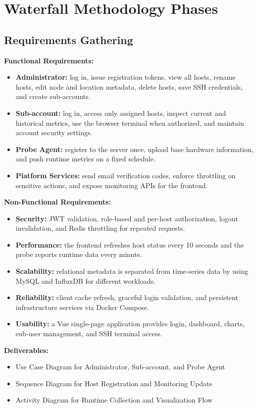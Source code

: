 \documentclass[11pt,a4paper]{article}
\begin{document}
\section{Waterfall Methodology Phases}

\subsection{Requirements Gathering}

\textbf{Functional Requirements:}
\begin{itemize}
  \item \textbf{Administrator:} log in, issue registration tokens, view all hosts, rename hosts, edit node and location metadata, delete hosts, save SSH credentials, and create sub-accounts.
  \item \textbf{Sub-account:} log in, access only assigned hosts, inspect current and historical metrics, use the browser terminal when authorized, and maintain account security settings.
  \item \textbf{Probe Agent:} register to the server once, upload base hardware information, and push runtime metrics on a fixed schedule.
  \item \textbf{Platform Services:} send email verification codes, enforce throttling on sensitive actions, and expose monitoring APIs for the frontend.
\end{itemize}

\textbf{Non-Functional Requirements:}
\begin{itemize}
  \item \textbf{Security:} JWT validation, role-based and per-host authorization, logout invalidation, and Redis throttling for repeated requests.
  \item \textbf{Performance:} the frontend refreshes host status every 10 seconds and the probe reports runtime data every minute.
  \item \textbf{Scalability:} relational metadata is separated from time-series data by using MySQL and InfluxDB for different workloads.
  \item \textbf{Reliability:} client cache refresh, graceful login validation, and persistent infrastructure services via Docker Compose.
  \item \textbf{Usability:} a Vue single-page application provides login, dashboard, charts, sub-user management, and SSH terminal access.
\end{itemize}

\textbf{Deliverables:}
\begin{itemize}
  \item Use Case Diagram for Administrator, Sub-account, and Probe Agent
  \item Sequence Diagram for Host Registration and Monitoring Update
  \item Activity Diagram for Runtime Collection and Visualization Flow
\end{itemize}
\end{document}
